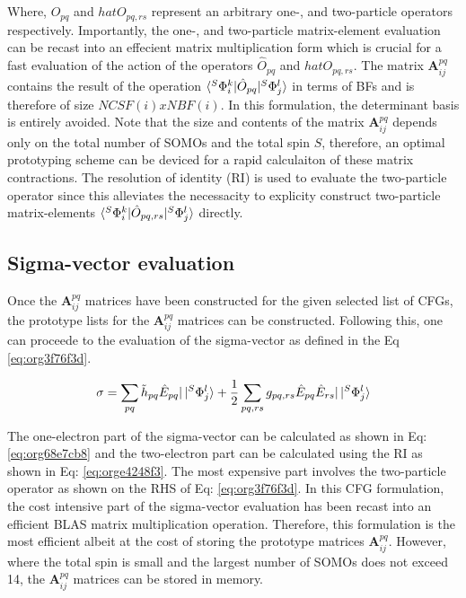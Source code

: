 \documentclass[11pt]{article}
\begin{document}
Where, \(\hat{O}_{pq}\) and \(hat{O}_{pq,rs}\) represent an arbitrary one-, and 
two-particle operators respectively. Importantly, the one-, and two-particle 
matrix-element evaluation can be recast into an effecient matrix multiplication 
form which is crucial for a fast evaluation of the action of the operators 
\(\hat{O}_{pq}\) and \(hat{O}_{pq,rs}\). The matrix \(\mathbf{A}^{pq}_{ij}\) contains
the result of the operation \(\braket{^S\Phi^k_i|\hat{O}_{pq}|^S\Phi^l_j}\) in terms 
of BFs and is therefore of size \(NCSF(i) \textit{x} NBF(i)\). In this formulation, the determinant basis is entirely avoided.
Note that the size and contents of the matrix \(\mathbf{A}^{pq}_{ij}\) depends
only on the total number of SOMOs and the total spin \(S\), therefore, an optimal
prototyping scheme can be deviced for a rapid calculaiton of these matrix contractions.
The resolution of identity (RI) is used to evaluate the two-particle operator since 
this alleviates the necessacity to explicity construct two-particle matrix-elements 
\(\braket{^S\Phi^k_i|\hat{O}_{pq,rs}|^S\Phi^l_j}\) directly.

\subsection{Sigma-vector evaluation}
\label{sec:orge1be4a8}

Once the \(\mathbf{A}^{pq}_{ij}\) matrices have been constructed for the given
selected list of CFGs, the prototype lists for the \(\mathbf{A}^{pq}_{ij}\) matrices
can be constructed. Following this, one can proceede to the evaluation of the sigma-vector 
as defined in the Eq \ref{eq:org3f76f3d}. 


\begin{equation}
\label{eq:org3f76f3d}
\sigma = \sum_{pq} \tilde{h}_{pq}\hat{E}_{pq}|\ket{^S\Phi^l_j} + \frac{1}{2}\sum_{pq,rs} g_{pq,rs} \hat{E}_{pq}\hat{E}_{rs}|\ket{^S\Phi^l_j} 
\end{equation}

The one-electron part of the sigma-vector can be calculated as shown in Eq: \ref{eq:org68e7cb8}
and the two-electron part can be calculated using the RI as shown in Eq: \ref{eq:orge4248f3}. 
The most expensive part involves the two-particle operator as shown on the RHS of Eq: \ref{eq:org3f76f3d}.
In this CFG formulation, the cost intensive part of the sigma-vector evaluation has been recast
into an efficient BLAS matrix multiplication operation. Therefore, this formulation is the most efficient
albeit at the cost of storing the prototype matrices \(\mathbf{A}^{pq}_{ij}\). However, where the total spin
is small and the largest number of SOMOs does not exceed 14, the \(\mathbf{A}^{pq}_{ij}\) matrices 
can be stored in memory.
\end{document}
